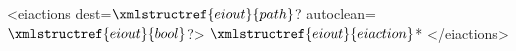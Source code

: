 <eiactions dest=$\xmlstructref{eiout}{path}$? autoclean=$\xmlstructref{eiout}{bool}$?>
  $\xmlstructref{eiout}{eiaction}$*
</eiactions>
